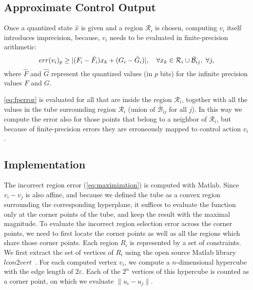 \subsection{Approximate Control Output}
\label{subsec:app_cont_err}


Once a quantized state $\hat x$ is given and a region $\mathcal R_i$ is chosen, computing $v_{i}$ itself introduces
imprecision, because, $v_{i}$ needs to be evaluated in finite-precision arithmetic:
\begin{equation}\label{eq:fperror}
  err(v_{i})_{p} \ge  | (F_i - \hat{F}_{i}) x_{k} + ( G_i - \hat{G}_{i} ) |,\quad \forall x_{k}\in \mathcal{R}_i\cup\bar{\mathcal B}_{ij},\,\,\forall j,
\end{equation}
where $\hat{F}$ and $\hat{G}$ represent the quantized values (in $p$ bits) for
the infinite precision values $F$ and $G$.

\autoref{eq:fperror} is evaluated for all \statevarmath that are inside the
region $\mathcal{R}_i$, together with all the values in the tube surrounding
region $\mathcal{R}_i$ (union of $\bar{\mathcal B}_{ij}$ for all $j$).
In this way we compute the error also for those points that belong to a neighbor
of $\mathcal{R}_i$, but because of finite-precision errors they are erroneously
mapped to control action $v_{i}$.

\subsection{Implementation}

The incorrect region error (\autoref{eq:maximization}) is computed with Matlab. Since $v_{i}-v_{j}$ is also affine, and because we defined the tube as a convex region 
surrounding the corresponding hyperplane, it suffices
to evaluate the function only at the corner points of the tube, and keep the
result with the maximal magnitude. 
To evaluate the incorrect region selection error across
the corner points, we need to first locate the corner points as well as all the
regions which share those corner points. 
Each region $R_i$ is represented by a set of constraints. We first extract the
set of vertices of $R_i$ using the open source Matlab library
$\mathit{lcon2vert}$~\cite{lcon2vertMatlab}.
For each computed vertex $v_i$, we compute a $n$-dimensional
hypercube with the edge length of $2 \varepsilon$. 
Each of the $2^n$ vertices of this hypercube is counted as a corner point, on which
we evaluate $\|u_i - u_j\|$. 

